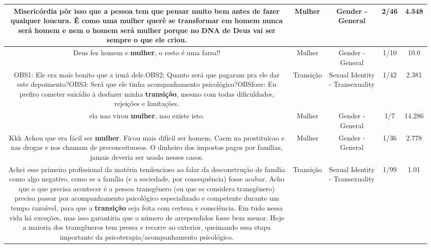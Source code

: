 \documentclass[11pt]{article}
\newlength\mylength
\begin{document}
\begin{center}
\begin{longtable}{|C{.65\mylength}|C{.30\mylength}|C{.12\mylength}|C{.12\mylength}|C{.12\mylength}|}
  \small Misericórdia pôr isso que a pessoa tem que pensar muito bem antes de fazer qualquer loucura. É como uma \textbf{mulher} querê se transformar em homem nunca será homem e nem o homem será \textbf{mulher} porque no DNA de Deus vai ser sempre o que ele criou.\normalsize   & Mulher & Gender - General & 2/46 & 4.348 \\  \hline
  \small Deus fez homem e \textbf{mulher}, o resto é uma farsa!!\normalsize   & Mulher & Gender - General & 1/10 & 10.0 \\  \hline
  \small OBS1: Ele era mais bonito que a irmã dele.OBS2: Quanto será que pagaram pra ele dar este depoimento?OBS3: Será que ele tinha acompanhamento psicológico?OBSfour: Eu prefiro cometer suicídio à desfazer minha \textbf{transição}, mesmo com todas dificuldades, rejeições e limitações.\normalsize   & Transição & Sexual Identity - Transexuality & 1/42 & 2.381 \\  \hline
  \small ela nao virou \textbf{mulher}, nao existe isto.\normalsize   & Mulher & Gender - General & 1/7 & 14.286 \\  \hline
  \small Kkk Achou que era fácil ser \textbf{mulher}. Ficou mais difícil ser homem. Caem na prostituicao e nas drogas e nos chamam de preconceituosos. O dinheiro dos impostos pagos por famílias, jamais deveria ser usado nesses casos.\normalsize   & Mulher & Gender - General & 1/36 & 2.778 \\  \hline
  \small Achei esse primeiro profissional da matéria tendencioso ao falar da desconstrução de família como algo negativo, como se a família (e a sociedade, por consequência) fosse acabar.  Acho que o que precisa acontecer é a pessoa transgênero (ou que se considera transgênero) precisa passar por acompanhamento psicológico especializado e competente durante um tempo razoável, para que a \textbf{transição} seja feita com certeza e consciência. Em tudo nessa vida há exceções, mas isso garantiria que o número de arrependidos fosse bem menor. Hoje a maioria dos transgêneros tem pressa e recorre ao exterior, queimando essa etapa importante da psicoterapia/acompanhamento psicológico.\normalsize   & Transição & Sexual Identity - Transexuality & 1/99 & 1.01 \\  \hline

\end{longtable}
\end{center}
\end{document}
